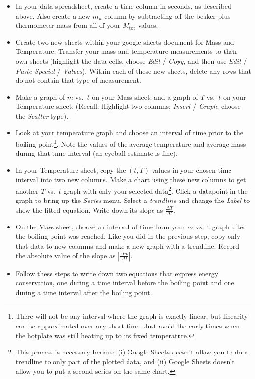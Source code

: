 	\begin{itemize}
	\item In your data spreadsheet, create a time column in seconds, as described above. Also create a new $m_w$ column by subtracting off the beaker plus thermometer mass from all of your $M_\text{tot}$ values.
	\item Create two new sheets within your google sheets document for Mass and Temperature. Transfer your mass and temperature measurements to their own sheets (highlight the data cells, choose {\em Edit} / {\em Copy}, and then use {\em Edit} / {\em Paste Special} / {\em Values}).  Within each of these  new sheets, delete any rows that do not contain that type of measurement.
	\item Make a graph of $m$ vs.\ $t$ on your Mass sheet;  and a graph of $T$ vs.\ $t$ on your Temperature sheet.  (Recall: Highlight two columns; {\em Insert} / {\em Graph}; choose the {\em Scatter} type).
	\item Look at your temperature graph and choose an interval of time prior to the boiling point\footnote{There will not be any interval where the graph is exactly linear, but linearity can be approximated over any short time.  Just avoid the early times when the hotplate was still heating up to its fixed temperature.}.    Note the values of the average temperature and average mass during that time interval (an eyeball estimate is fine).
	\item In your Temperature sheet, copy the $(t, T)$ values in your chosen time interval into two new columns. Make a chart using these new columns to get another $T$ vs.\ $t$ graph with only your selected data\footnote{This process is necessary because (i) Google Sheets doesn't allow you to do a trendline to only part of the plotted data, and (ii) Google Sheets doesn't allow you to put a second series on the same chart.}.  Click a datapoint in the graph to bring up the {\em Series} menu.  Select a {\em trendline} and change the {\em Label} to show the fitted equation.  Write down its slope as $\frac{\Delta T}{\Delta t}$.
	\item On the Mass sheet, choose an interval of time from your $m$ vs.\ t graph after the boiling point was reached. Like you did in the previous step, copy only that data to new columns and make a new graph with a trendline.  Record the absolute value of the slope as $\left| \frac{\Delta m}{\Delta t}\right|$.
	\item Follow these steps to write down two equations that express energy conservation, one during a time interval before  the boiling point and one during a time interval after the boiling point.

\end{itemize}
